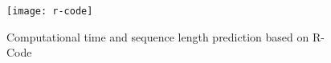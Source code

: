 \documentclass[DIV=13,fontsize=11pt]{scrartcl}
\begin{document}
\begin{figure}[h]
    \centering
    \texttt{[image: r-code]}
    \caption{Computational time and sequence length prediction based on R-Code}
    \label{fig:mesh1}
\end{figure}







\end{document}
